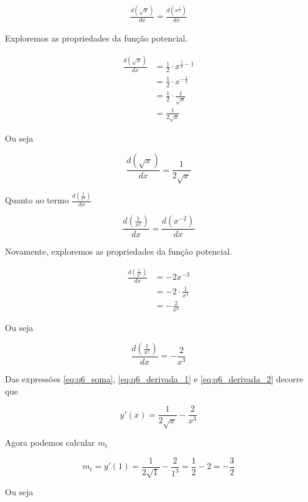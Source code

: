 \documentclass{article}
\begin{document}
\begin{align*}
    \frac{d(\sqrt{x})}{dx}
    =
    \frac{d(x^{\frac{1}{2}})}{dx}
\end{align*}

Exploremos as propriedades da função potencial.

\begin{align*}
    \frac{d(\sqrt{x})}{dx}
    &=
    \frac{1}{2} \cdot x^{\frac{1}{2} - 1}
    \\
    &=
    \frac{1}{2} \cdot x^{-\frac{1}{2}}
    \\
    &=
    \frac{1}{2} \cdot \frac{1}{\sqrt{x}}
    \\
    &=
    \frac{1}{2\sqrt{x}}
\end{align*}

Ou seja

\begin{equation}\label{eq:q6_derivada_1}
    \frac{d(\sqrt{x})}{dx} = \frac{1}{2\sqrt{x}}
\end{equation}

Quanto ao termo \( \frac{d(\frac{1}{x^2})}{dx}\)


\[
    \frac{d(\frac{1}{x^2})}{dx}  = \frac{d(x^{-2})}{dx}
\]

Novamente, exploremos as propriedades da função potencial.

\begin{align*}
    \frac{d(\frac{1}{x^2})}{dx} 
    &= -2x^{-3}
    \\
    &= -2 \cdot \frac{1}{x^3}
    \\
    &= -\frac{2}{x^3}
\end{align*}

Ou seja 

\begin{equation}\label{eq:q6_derivada_2}
    \frac{d(\frac{1}{x^2})}{dx} = -\frac{2}{x^3}
\end{equation}

Das expressões
\ref{eq:q6_soma},
\ref{eq:q6_derivada_1} e
\ref{eq:q6_derivada_2}
decorre que

\begin{equation}\label{eq:q6_derivada_res}
    y'(x) = \frac{1}{2\sqrt{x}} - \frac{2}{x^3}
\end{equation}

Agora podemos calcular \(m_t\)

\[
  m_t 
  =  y'(1) 
  = \frac{1}{2\sqrt{1}} - \frac{2}{1^3} 
  = \frac{1}{2} - 2
  = - \frac{3}{2}
\]

Ou seja
\end{document}
